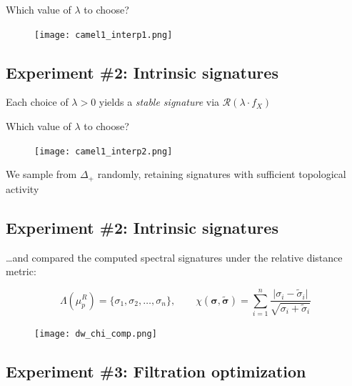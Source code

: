 \documentclass[
  letterpaper,
  DIV=11,
  numbers=noendperiod,
  oneside]{scrartcl}
\begin{document}
Which value of \(\lambda\) to choose?

\begin{figure}

{\centering \texttt{[image: camel1\_interp1.png]}

}

\end{figure}

\hypertarget{experiment-2-intrinsic-signatures-8}{%
\subsection{Experiment \#2: Intrinsic
signatures}\label{experiment-2-intrinsic-signatures-8}}

Each choice of \(\lambda > 0\) yields a \emph{stable signature} via
\(\mathcal{R}(\lambda \cdot f_X)\)

Which value of \(\lambda\) to choose?

\begin{figure}

{\centering \texttt{[image: camel1\_interp2.png]}

}

\end{figure}

We sample from \(\Delta_+\) randomly, retaining signatures with
sufficient topological activity

\hypertarget{experiment-2-intrinsic-signatures-9}{%
\subsection{Experiment \#2: Intrinsic
signatures}\label{experiment-2-intrinsic-signatures-9}}

\ldots and compared the computed spectral signatures under the relative
distance metric:

\[
\Lambda(\mu_p^R) = \{\sigma_1, \sigma_2, \dots, \sigma_n \}, \quad \quad \chi(\mathbf{\sigma}, \mathbf{\tilde{\sigma}}) = \sum\limits_{i=1}^n \frac{\lvert \sigma_i - \tilde{\sigma}_i \rvert}{\sqrt{\sigma_i + \tilde{\sigma}_i}}
\]

\begin{figure}

{\centering \texttt{[image: dw\_chi\_comp.png]}

}

\end{figure}

\hypertarget{experiment-3-filtration-optimization}{%
\subsection{Experiment \#3: Filtration
optimization}\label{experiment-3-filtration-optimization}}
\end{document}
